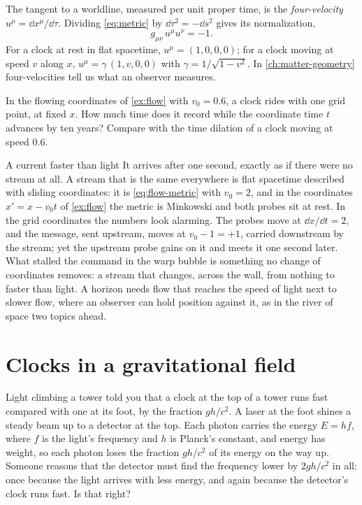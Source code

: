 The tangent to a worldline, measured per unit proper time, is the
\emph{four-velocity} $u^{\mu} = \dd x^{\mu}/\dd\tau$. Dividing \cref{eq:metric}
by $\dd\tau^{2} = -\dd s^{2}$ gives its normalization,
\begin{equation}
  g_{\mu\nu}\,u^{\mu}u^{\nu} = -1.
  \label{eq:four-velocity}
\end{equation}
For a clock at rest in flat spacetime, $u^{\mu} = (1,0,0,0)$; for a clock moving
at speed $v$ along $x$, $u^{\mu} = \gamma\,(1, v, 0, 0)$ with
$\gamma = 1/\sqrt{1-v^{2}}$. In \cref{ch:matter-geometry} four-velocities tell
us what an observer measures.

\begin{checkpoint}[label=chk:grid-clock]
In the flowing coordinates of \cref{ex:flow} with $v_{0} = 0.6$, a clock rides
with one grid point, at fixed $x$. How much time does it record while the
coordinate time $t$ advances by ten years? Compare with the time dilation of a
clock moving at speed $0.6$.
\end{checkpoint}

\begin{revisited}{A current faster than light}
It arrives after one second, exactly as if there were no stream at all. A
stream that is the same everywhere is flat spacetime described with sliding
coordinates: it is \cref{eq:flow-metric} with $v_{0} = 2$, and in the
coordinates $x' = x - v_{0}t$ of \cref{ex:flow} the metric is Minkowski and
both probes sit at rest. In the grid coordinates the numbers look alarming.
The probes move at $\dd x/\dd t = 2$, and the message, sent upstream, moves at
$v_{0} - 1 = +1$, carried downstream by the stream; yet the upstream probe
gains on it and meets it one second later. What stalled the command in the
warp bubble is something no change of coordinates removes: a stream that
changes, across the wall, from nothing to faster than light. A horizon needs
flow that reaches the speed of light next to slower flow, where an observer
can hold position against it, as in the river of space two topics ahead.
\end{revisited}

\section{Clocks in a gravitational field}\label{sec:clocks}

\begin{thought}{Light climbing a tower}
 told you that a clock at the top of a tower runs fast
compared with one at its foot, by the fraction $gh/c^{2}$. A laser at the foot
shines a steady beam up to a detector at the top. Each photon carries the
energy $E = hf$, where $f$ is the light's frequency and $h$ is Planck's
constant, and energy has weight, so each photon loses the fraction $gh/c^{2}$
of its energy on the way up. Someone reasons that the detector must find the
frequency lower by $2gh/c^{2}$ in all: once because the light arrives with
less energy, and again because the detector's clock runs fast. Is that right?
\end{thought}

